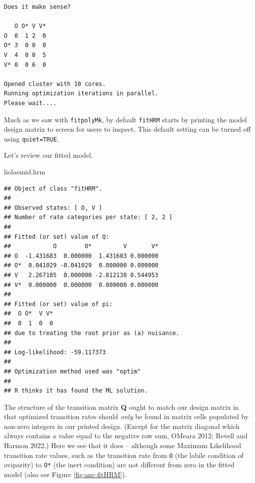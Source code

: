 \documentclass[fleqn,10pt,lineno]{wlpeerj} %
\newenvironment{Shaded}{\begin{snugshade}}{\end{snugshade}}
\newcommand{\NormalTok}[1]{#1}
\begin{document}
\begin{verbatim}
Does it make sense?

   O O* V V*
O  0  1 2  0
O* 3  0 0  0
V  4  0 0  5
V* 0  0 6  0

Opened cluster with 10 cores.
Running optimization iterations in parallel.
Please wait....
\end{verbatim}

Much as we saw with \texttt{fitpolyMk}, by default \texttt{fitHRM} starts by printing the model design matrix to screen for users to inspect. This default setting can be turned off using \texttt{quiet=TRUE}.

Let's review our fitted model.

\begin{Shaded}
\begin{Highlighting}[]
\NormalTok{liolaemid.hrm}
\end{Highlighting}
\end{Shaded}

\begin{verbatim}
## Object of class "fitHRM".
## 
## Observed states: [ O, V ]
## Number of rate categories per state: [ 2, 2 ]
## 
## Fitted (or set) value of Q:
##            O        O*         V       V*
## O  -1.431683  0.000000  1.431683 0.000000
## O*  0.041029 -0.041029  0.000000 0.000000
## V   2.267185  0.000000 -2.812138 0.544953
## V*  0.000000  0.000000  0.000000 0.000000
## 
## Fitted (or set) value of pi:
##  O O*  V V* 
##  0  1  0  0 
## due to treating the root prior as (a) nuisance.
## 
## Log-likelihood: -59.117373 
## 
## Optimization method used was "optim"
## 
## R thinks it has found the ML solution.
\end{verbatim}

The structure of the transition matrix \textbf{Q} ought to match our design matrix in that optimized transition rates should \emph{only} be found in matrix cells populated by non-zero integers in our printed design. (Except for the matrix diagonal which always contains a value equal to the negative row sum, OMeara 2012; Revell and Harmon 2022.) Here we see that it does -- although some Maximum Likelihood transition rate values, such as the transition rate from \texttt{O} (the labile condition of oviparity) to \texttt{O*} (the inert condition) are not different from zero in the fitted model (also see Figure \ref{fig:anc-fitHRM}).
\end{document}
